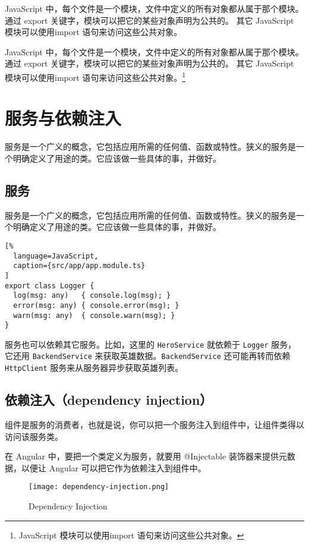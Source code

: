 \documentclass{progbookcn}
\begin{document}
\begin{exclamation}
  JavaScript 中，每个文件是一个模块，文件中定义的所有对象都从属于那个模块。 通过 export 关键字，模块可以把它的某些对象声明为公共的。 其它 JavaScript 模块可以使用import 语句来访问这些公共对象。
\end{exclamation}


JavaScript 中，每个文件是一个模块，文件中定义的所有对象都从属于那个模块。 通过 export 关键字，模块可以把它的某些对象声明为公共的。 其它 JavaScript 模块可以使用import 语句来访问这些公共对象。\footnote{JavaScript 模块可以使用import 语句来访问这些公共对象。}

\chapter{服务与依赖注入}

服务是一个广义的概念，它包括应用所需的任何值、函数或特性。狭义的服务是一个明确定义了用途的类。它应该做一些具体的事，并做好。


\section{服务}

服务是一个广义的概念，它包括应用所需的任何值、函数或特性。狭义的服务是一个明确定义了用途的类。它应该做一些具体的事，并做好。

\begin{lstlisting}[%
  language=JavaScript,
  caption={src/app/app.module.ts}
]
export class Logger {
  log(msg: any)   { console.log(msg); }
  error(msg: any) { console.error(msg); }
  warn(msg: any)  { console.warn(msg); }
}
\end{lstlisting}

服务也可以依赖其它服务。比如，这里的 \verb|HeroService| 就依赖于 \verb|Logger| 服务，它还用 \verb|BackendService| 来获取英雄数据。\verb|BackendService| 还可能再转而依赖 \verb|HttpClient| 服务来从服务器异步获取英雄列表。

\section{依赖注入（dependency injection）}


组件是服务的消费者，也就是说，你可以把一个服务注入到组件中，让组件类得以访问该服务类。

在 Angular 中，要把一个类定义为服务，就要用 @Injectable 装饰器来提供元数据，以便让 Angular 可以把它作为依赖注入到组件中。

\begin{wrapfigure}{r}{5cm}
  \centering
  \texttt{[image: dependency-injection.png]}
  \caption{Dependency Injection}
  \label{fig:di}
\end{wrapfigure}
\end{document}
